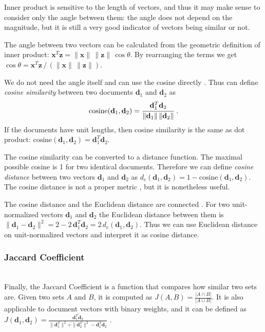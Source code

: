 Inner product is sensitive to the length of vectors, and thus
it may make sense to consider only the angle between them:
the angle does not depend on the magnitude, but it is still
a very good indicator of vectors being similar or not.

The angle between two vectors can be calculated from the geometric
definition of inner product:
$\mathbf x^T \mathbf z = \|\mathbf x \| \, \| \mathbf z \| \, \cos \theta$.
By rearranging the terms we get
$\cos \theta = \mathbf x^T \mathbf z \, / \, (\|\mathbf x \| \, \| \mathbf z \|)$.

We do not need the angle itself and can use the cosine directly
\cite{manning2008introduction}.
Thus can define \emph{cosine similarity} between two documents $\mathbf d_1$ and
$\mathbf d_2$ as
$$\text{cosine}(\mathbf d_1, \mathbf d_2) = \cfrac{\mathbf d_1^T \mathbf d_2}{\|\mathbf d_1 \| \, \| \mathbf d_2 \|} \ .$$
If the documents have unit lengths, then cosine similarity is the same as
dot product: $\text{cosine}(\mathbf d_1, \mathbf d_2) = \mathbf d_1^T \mathbf d_2$.

The cosine similarity can be converted to a distance function.
The maximal possible cosine is 1 for two identical documents.
Therefore we can define \emph{cosine distance} between two vectors
$\mathbf d_1$ and $\mathbf d_2$ as
$d_c(\mathbf d_1, \mathbf d_2) = 1 - \text{cosine}(\mathbf d_1, \mathbf d_2)$.
The cosine distance is not a proper metric \cite{korenius2007principal},
but it is nonetheless useful.

The cosine distance and the Euclidean distance are connected \cite{korenius2007principal}.
For two unit-normalized vectors $\mathbf d_1$ and $\mathbf d_2$ the Euclidean distance
between them is $\| \mathbf d_1 - \mathbf d_2 \|^2 = 2 - 2 \, \mathbf d_1^T \mathbf d_2 =2 \, d_c(\mathbf d_1, \mathbf d_2)$. Thus we can use Euclidean distance on
unit-normalized vectors and interpret it as cosine distance.


\subsubsection{Jaccard Coefficient} \ \\

Finally, the Jaccard Coefficient is a function that compares how similar
two sets are. Given two sets $A$ and $B$, it is computed as
$J(A, B) = \frac{|A \cap B|}{|A \cup B|}$.
It is also applicable to document vectors with binary weights, and it can
be defined as $J(\mathbf d_1, \mathbf d_2) =
\frac{\mathbf d_1^T \mathbf d_2}{\| \mathbf d_1^T \|^2 + \| \mathbf d_2^T \|^2 - \mathbf d_1^T \mathbf d_2}$ \cite{manning2008introduction}.



